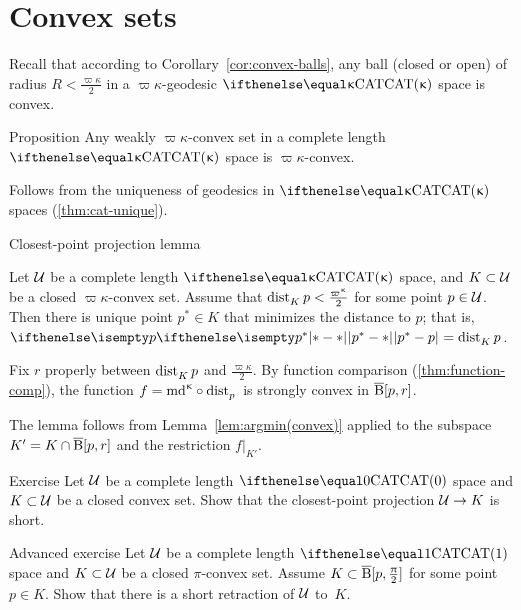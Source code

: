

 

\section{Convex sets}\label{sec:convex-CBA}

Recall that according to Corollary~\ref{cor:convex-balls}, any ball (closed or open) of radius $R<\tfrac{\varpi\kappa}2$ in a $\varpi\kappa$-geodesic $\CAT\kappa$ space is convex.

\begin{thm}{Proposition}
Any weakly $\varpi\kappa$-convex set 
in a complete length $\CAT\kappa$ space is $\varpi\kappa$-convex.
\end{thm}

Follows from the uniqueness of geodesics in $\CAT\kappa$ spaces (\ref{thm:cat-unique}).
\qeds


\begin{thm}{Closest-point projection lemma}\label{lem:closest point}{\sloppy 
Let $\mathcal{U}$ be a complete length $\CAT\kappa$ space, and $K\subset \spc{U}$ be a closed $\varpi\kappa$-convex set. 
Assume that $\distfun{K}{p}{}<\tfrac{\varpi\kappa}2$ for some point $p\in \spc{U}$.
Then  
there is unique point $p^*\in K$ that minimizes the distance to $p$;
that is, $\dist{p^*}{p}{}=\distfun{K}{p}{}$. 

}

\end{thm}

Fix $r$ properly between $\mathop{\rm dist}\nolimits_{K}^{{}}{p}{}$ and $\tfrac{\varpi\kappa}2$.
By function comparison (\ref{thm:function-comp}),
the function $f=\md\kappa\circ\distfun{p}{}{}$ is strongly convex in $\overline{\mathrm{B}}{}[p,r]$.

The lemma follows from Lemma~\ref{lem:argmin(convex)} applied to the subspace $K'\z=K\cap\cBall[p,r]$ 
and the restriction $f|_{K'}$. 
\qeds

\begin{thm}{Exercise}\label{ex:closest-point-projection}
Let  $\mathcal{U}$ be a complete length $\CAT0$ space and $K\subset \spc{U}$ be a closed convex set.
Show that the closest-point projection $\spc{U}\to K$ is short. 
\end{thm}

\begin{thm}{Advanced exercise}\label{ex:short-retraction-CBA(1)}
Let  $\mathcal{U}$ be a complete length $\CAT1$ space and $K\subset \spc{U}$ be a closed $\pi$-convex set.
Assume $K\subset \cBall[p,\tfrac\pi2]$ for some point $p\in K$.
Show that there is a short retraction of $\mathcal{U}$ to~$K$. 
\end{thm}

